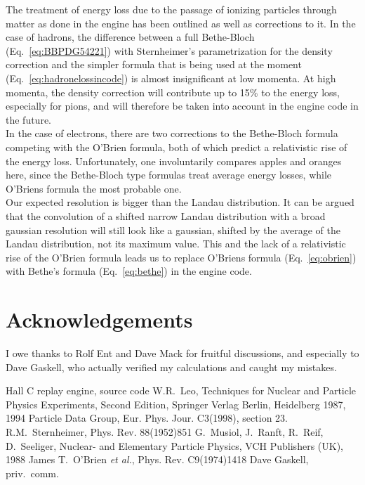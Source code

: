 The treatment of energy loss due to the passage of ionizing particles through matter
as done in the engine has been outlined as well as corrections to it. In the case of 
hadrons, the difference between a full Bethe-Bloch (Eq.~\ref{eq:BBPDG54221}) with
Sternheimer's parametrization for the density correction \cite{Sternheimer}
and the simpler formula that is being used at the moment (Eq.~\ref{eq:hadronelossincode})
is almost insignificant at low momenta. At high momenta, the density correction will
contribute up to 15\% to the energy loss, especially for pions, and will therefore be 
taken into account in the engine code in the future.\\
In the case of electrons, there are two corrections to the Bethe-Bloch formula
competing with the O'Brien formula, both of which predict a relativistic rise of the
energy loss. Unfortunately, one involuntarily compares apples and oranges here, since
the Bethe-Bloch type formulas treat average energy losses, while O'Briens formula the
most probable one.\\
Our expected resolution is bigger than the Landau distribution.
It can be argued that the convolution of a shifted narrow Landau distribution with a broad
gaussian resolution will still look like a gaussian, shifted by the average of the Landau
distribution, not its maximum value. This and the lack of a relativistic rise of the
O'Brien formula leads us to replace O'Briens formula (Eq.~\ref{eq:obrien}) with Bethe's 
formula (Eq.~\ref{eq:bethe}) in the engine code.

\section{Acknowledgements}

I owe thanks to Rolf Ent and Dave Mack for fruitful discussions, and especially to Dave 
Gaskell, who actually verified my calculations and caught my mistakes.

\begin{thebibliography}{99}
 Hall C replay engine, source code
 W.R.~Leo, Techniques for Nuclear and Particle Physics Experiments, Second
Edition, Springer Verlag Berlin, Heidelberg 1987, 1994
 Particle Data Group, Eur. Phys. Jour. C3(1998), section 23. 
 R.M.~Sternheimer, Phys. Rev. 88(1952)851
 G.~Musiol, J.~Ranft, R.~Reif, D.~Seeliger, Nuclear- and 
Elementary Particle Physics, VCH Publishers (UK), 1988
 James T.~O'Brien {\em et al.}, Phys. Rev. C9(1974)1418
 Dave Gaskell, priv.\ comm.
\end{thebibliography}

